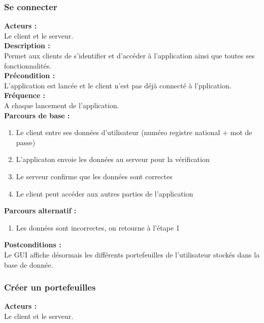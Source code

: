 \documentclass[../rapport.tex]{subfiles}
\begin{document}
\subsubsection{Se connecter}

\textbf{Acteurs :} \\
Le client et le serveur. \\

\textbf{Description :} \\
Permet aux clients de s'identifier et d'accéder à l'application ainsi que toutes ses fonctionnalités. \\

\textbf{Précondition :} \\
L'application est lancée et le client n'est pas déjà connecté à l'pplication. \\

\textbf{Fréquence :} \\
A chaque lancement de l'application. \\

\textbf{Parcours de base :} \\
\begin{enumerate}
    \item Le client entre ses données d'utilisateur (numéro registre national + mot de passe)
    \item L'applicaton envoie les données au serveur pour la vérification
    \item Le serveur confirme que les données sont correctes
    \item Le client peut accéder aux autres parties de l'application
\end{enumerate}
\bigskip

\textbf{Parcours alternatif :}
\begin{enumerate}
    \item Les données sont incorrectes, on retourne à l'étape 1
\end{enumerate}

\textbf{Postconditions :} \\
Le GUI affiche désormais les différents portefeuilles de l'utilisateur stockés dans la base de donnée. \\



\subsubsection{Créer un portefeuilles}

\textbf{Acteurs :} \\
 Le client et le serveur. \\
\end{document}
